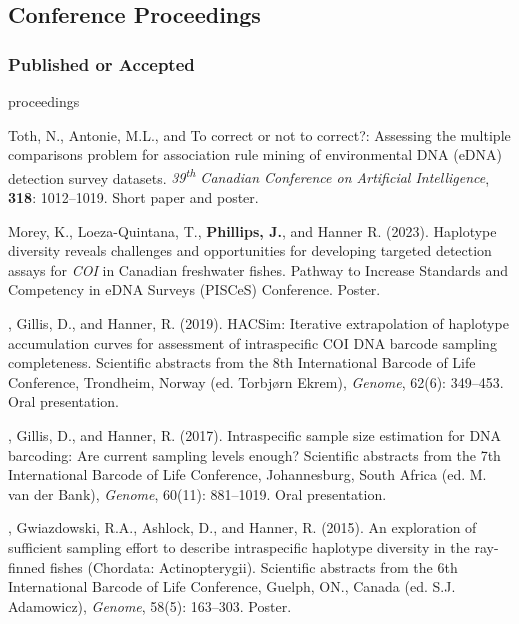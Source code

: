 \subsection{Conference Proceedings}
\subsubsection{Published or Accepted}
\begin{revlist}[itemsep=0.45\baselineskip]{proceedings}
\item \dsup Toth, N., Antonie, M.L., and \me To correct or not to correct?:
  Assessing the multiple comparisons problem for association rule mining of
  environmental DNA (eDNA) detection survey datasets.
  \textit{39\textsuperscript{th} Canadian Conference on Artificial Intelligence},
  \textbf{318}: 1012--1019. Short paper and poster.
\item Morey, K., Loeza-Quintana, T., \textbf{Phillips, J.}, and Hanner R. (2023).
  Haplotype diversity reveals challenges and opportunities for developing
  targeted detection assays for \textit{COI} in Canadian freshwater fishes.
  Pathway to Increase Standards and Competency in eDNA Surveys (PISCeS)
  Conference. Poster.
\item \me, Gillis, D., and Hanner, R. (2019). HACSim: Iterative extrapolation of
  haplotype accumulation curves for assessment of intraspecific COI DNA barcode
  sampling completeness. Scientific abstracts from the 8th International Barcode
  of Life Conference, Trondheim, Norway (ed. Torbjørn Ekrem), \textit{Genome},
  62(6): 349--453. Oral presentation.
\item \me, Gillis, D., and Hanner, R. (2017). Intraspecific sample size
  estimation for DNA barcoding: Are current sampling levels enough? Scientific
  abstracts from the 7th International Barcode of Life Conference, Johannesburg,
  South Africa (ed. M. van der Bank), \textit{Genome}, 60(11): 881--1019. Oral
  presentation.
\item \me, Gwiazdowski, R.A., Ashlock, D., and Hanner, R. (2015). An exploration
  of sufficient sampling effort to describe intraspecific haplotype diversity in
  the ray-finned fishes (Chordata: Actinopterygii). Scientific abstracts from the
  6th International Barcode of Life Conference, Guelph, ON., Canada (ed. S.J.
  Adamowicz), \textit{Genome}, 58(5): 163--303. Poster.
\end{revlist}


